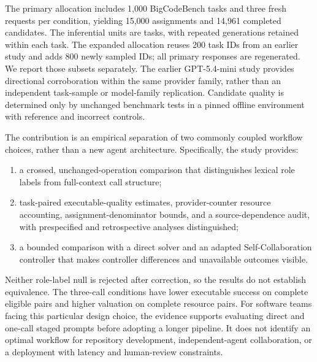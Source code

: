 The primary allocation includes 1,000 BigCodeBench tasks and three fresh requests per condition, yielding 15,000 assignments and 14,961 completed candidates. The inferential units are tasks, with repeated generations retained within each task. The expanded allocation reuses 200 task IDs from an earlier study and adds 800 newly sampled IDs; all primary responses are regenerated. We report those subsets separately. The earlier GPT-5.4-mini study provides directional corroboration within the same provider family, rather than an independent task-sample or model-family replication. Candidate quality is determined only by unchanged benchmark tests in a pinned offline environment with reference and incorrect controls.

The contribution is an empirical separation of two commonly coupled workflow choices, rather than a new agent architecture. Specifically, the study provides:
\begin{enumerate}
\item a crossed, unchanged-operation comparison that distinguishes lexical role labels from full-context call structure;
\item task-paired executable-quality estimates, provider-counter resource accounting, assignment-denominator bounds, and a source-dependence audit, with prespecified and retrospective analyses distinguished;
\item a bounded comparison with a direct solver and an adapted Self-Collaboration controller that makes controller differences and unavailable outcomes visible.
\end{enumerate}
Neither role-label null is rejected after correction, so the results do not establish equivalence. The three-call conditions have lower executable success on complete eligible pairs and higher valuation on complete resource pairs. For software teams facing this particular design choice, the evidence supports evaluating direct and one-call staged prompts before adopting a longer pipeline. It does not identify an optimal workflow for repository development, independent-agent collaboration, or a deployment with latency and human-review constraints.

